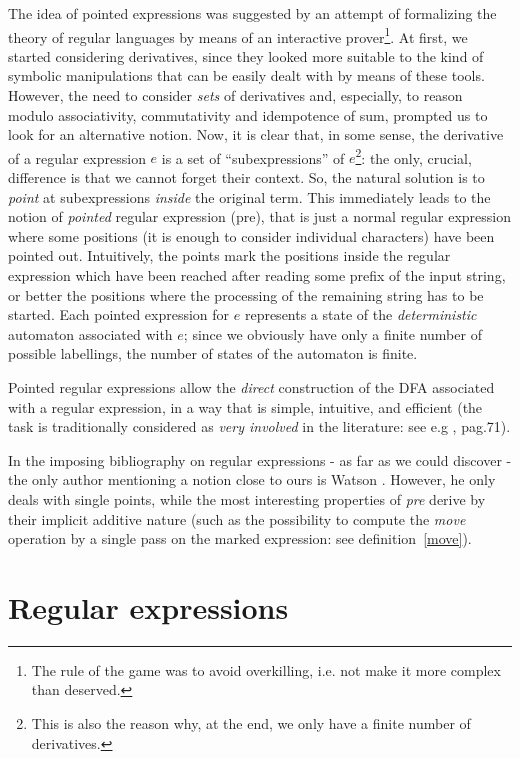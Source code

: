 \documentclass[preprint]{sigplanconf}
\begin{document}
The idea of pointed expressions was suggested 
by an attempt of formalizing the theory
of regular languages by means of an interactive prover\footnote{The rule
of the game was to avoid overkilling, i.e. not make it more complex
than deserved.}. At first,
we started considering derivatives, since they looked more suitable
to the kind of symbolic manipulations that can be easily dealt with 
by means of these tools. However, the need to consider {\em sets} of
derivatives and, especially, to reason modulo associativity, commutativity
and idempotence of sum, prompted us to look for an alternative notion.
Now, it is clear that, in some sense, the derivative of a regular expression
$e$ is a set of  ``subexpressions'' of $e$\footnote{This is also the reason why, at
the end, we only have a finite number of derivatives.}: the only, 
crucial, difference is that we cannot forget their context. So, the natural 
solution is to {\em point} at subexpressions {\em inside} the original term.
This immediately leads to the notion of {\em pointed} regular expression
(pre), that is just a normal regular expression where some positions
(it is enough to consider individual characters) have been pointed
out. Intuitively, the points mark the positions inside the regular
expression which have been reached after reading some prefix of
the input string, or better the positions where the processing
of the remaining string has to be started. Each pointed expression
for $e$ represents a state of the {\em deterministic} automaton associated
with $e$; since we obviously have only a finite number of possible
labellings, the number of states of the automaton is finite.

Pointed regular expressions allow the {\em direct} construction of 
the DFA \cite{Kleene56}
associated with a regular expression, in a way that is
simple, intuitive, and efficient (the task is traditionally 
considered as {\em very involved} in the literature: see e.g
\cite{RS97}, pag.71).

In the imposing
bibliography on regular expressions - as far as we could discover -
the only author mentioning a notion close to ours is Watson \cite{Watson01,Watson02}. 
However, he only deals with single points, while the most 
interesting properties
of {\em pre} derive by their implicit additive nature (such as the
possibility to compute the {\em move} operation by a single pass on
the marked expression: see definition~\ref{move}).

\section{Regular expressions}
\end{document}
